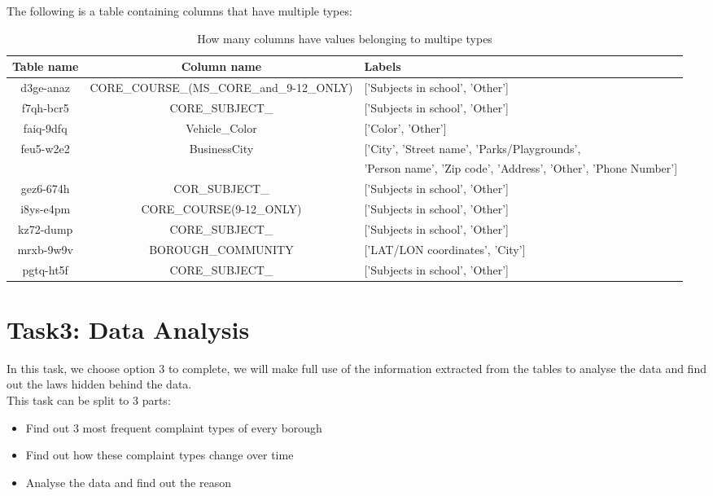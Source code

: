 \documentclass[sigconf]{acmart}
\begin{document}
The following is a table containing columns that have multiple types:
\begin{table*}
  \caption{How many columns have values belonging to multipe types}
  \label{tab:commands}
  \begin{tabular}{ccl}
    \toprule
    Table name& Column name& Labels\\
    \midrule
    d3ge-anaz& CORE\_COURSE\_(MS\_CORE\_and\_9-12\_ONLY)& ['Subjects in school', 'Other']\\
    f7qh-bcr5& CORE\_SUBJECT\_& ['Subjects in school', 'Other']\\
    faiq-9dfq& Vehicle\_Color& ['Color', 'Other']\\
    feu5-w2e2& BusinessCity& ['City', 'Street name', 'Parks/Playgrounds', \\
    &&'Person name', 'Zip code', 'Address', 'Other', 'Phone Number']\\
    gez6-674h& COR\_SUBJECT\_& ['Subjects in school', 'Other']\\
    i8ys-e4pm& CORE\_COURSE(9-12\_ONLY)& ['Subjects in school', 'Other']\\
    kz72-dump& CORE\_SUBJECT\_& ['Subjects in school', 'Other']\\
    mrxb-9w9v& BOROUGH\_COMMUNITY& ['LAT/LON coordinates', 'City']\\
    pgtq-ht5f& CORE\_SUBJECT\_& ['Subjects in school', 'Other']\\
  \bottomrule
\end{tabular}
\end{table*}

\section{Task3: Data Analysis}
In this task, we choose option 3 to complete, we will make full use of the information extracted from the tables to analyse the data and find out the laws hidden behind the data. \\
This task can be split to 3 parts:
\begin{itemize}
    \item Find out 3 most frequent complaint types of every borough
    \item Find out how these complaint types change over time
    \item Analyse the data and find out the reason
\end{itemize}
\end{document}
